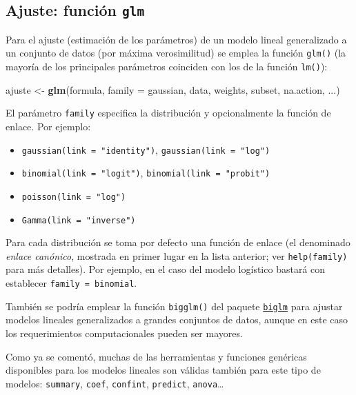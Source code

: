 \documentclass[
]{book}
\newenvironment{Shaded}{\begin{snugshade}}{\end{snugshade}}
\newcommand{\DataTypeTok}[1]{\textcolor[rgb]{0.13,0.29,0.53}{#1}}
\newcommand{\KeywordTok}[1]{\textcolor[rgb]{0.13,0.29,0.53}{\textbf{#1}}}
\newcommand{\NormalTok}[1]{#1}
\newcommand{\StringTok}[1]{\textcolor[rgb]{0.31,0.60,0.02}{#1}}
\theoremstyle{break}
\theoremstyle{definition}
\theoremstyle{definition}
\theoremstyle{definition}
\theoremstyle{remark}
\begin{document}
\hypertarget{ajuste-funciuxf3n-glm}{%
\subsection{\texorpdfstring{Ajuste: función \texttt{glm}}{Ajuste: función glm}}\label{ajuste-funciuxf3n-glm}}

Para el ajuste (estimación de los parámetros) de un modelo lineal generalizado a un conjunto de datos (por máxima verosimilitud) se emplea la función \texttt{glm()} (la mayoría de los principales parámetros coinciden con los de la función \texttt{lm()}):

\begin{Shaded}
\begin{Highlighting}[]
\NormalTok{ajuste <-}\StringTok{ }\KeywordTok{glm}\NormalTok{(formula, }\DataTypeTok{family =}\NormalTok{ gaussian, data, weights, subset, na.action, ...)}
\end{Highlighting}
\end{Shaded}

El parámetro \texttt{family} especifica la distribución y opcionalmente la función de enlace.
Por ejemplo:

\begin{itemize}
\item
  \texttt{gaussian(link\ =\ "identity")}, \texttt{gaussian(link\ =\ "log")}
\item
  \texttt{binomial(link\ =\ "logit")}, \texttt{binomial(link\ =\ "probit")}
\item
  \texttt{poisson(link\ =\ "log")}
\item
  \texttt{Gamma(link\ =\ "inverse")}
\end{itemize}

Para cada distribución se toma por defecto una función de enlace (el denominado \emph{enlace canónico}, mostrada en primer lugar en la lista anterior; ver \texttt{help(family)} para más detalles).
Por ejemplo, en el caso del modelo logístico bastará con establecer \texttt{family\ =\ binomial}.

También se podría emplear la función \texttt{bigglm()} del paquete \href{https://CRAN.R-project.org/package=biglm}{\texttt{biglm}} para ajustar modelos lineales generalizados a grandes conjuntos de datos, aunque en este caso los requerimientos computacionales pueden ser mayores.

Como ya se comentó, muchas de las herramientas y funciones genéricas disponibles para los modelos lineales son válidas también para este tipo de modelos: \texttt{summary}, \texttt{coef}, \texttt{confint}, \texttt{predict}, \texttt{anova}\ldots{}
\end{document}
